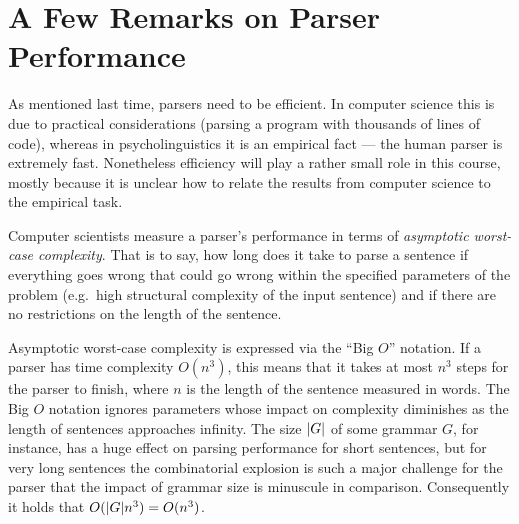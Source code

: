 \section{A Few Remarks on Parser Performance}
\label{sec:ParserOverview_Performance}

As mentioned last time, parsers need to be efficient.
In computer science this is due to practical considerations (parsing a program with thousands of lines of code), whereas in psycholinguistics it is an empirical fact --- the human parser is extremely fast.
Nonetheless efficiency will play a rather small role in this course, mostly because it is unclear how to relate the results from computer science to the empirical task.

Computer scientists measure a parser's performance in terms of \emph{asymptotic worst-case complexity}.
That is to say, how long does it take to parse a sentence if everything goes wrong that could go wrong within the specified parameters of the problem (e.g.\ high structural complexity of the input sentence) and if there are no restrictions on the length of the sentence.

Asymptotic worst-case complexity is expressed via the ``Big $O$'' notation.
If a parser has time complexity $O(n^3)$, this means that it takes at most $n^3$ steps for the parser to finish, where $n$ is the length of the sentence measured in words.
The Big $O$ notation ignores parameters whose impact on complexity diminishes as the length of sentences approaches infinity.
The size $| G |$ of some grammar $G$, for instance, has a huge effect on parsing performance for short sentences, but for very long sentences the combinatorial explosion is such a major challenge for the parser that the impact of grammar size is minuscule in comparison.
Consequently it holds that $O(| G | n^3) = O(n^3)$.

